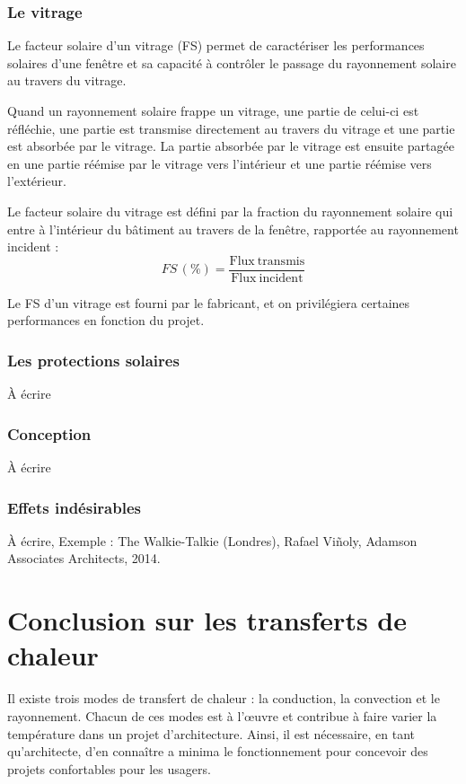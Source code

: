 \subsection*{Le vitrage}
Le facteur solaire d'un vitrage (FS) permet de caractériser les performances solaires d'une fenêtre et sa capacité à contrôler le passage du rayonnement solaire au travers du vitrage.

Quand un rayonnement solaire frappe un vitrage, une partie de celui-ci est réfléchie, une partie est transmise directement au travers du vitrage et une partie est absorbée par le vitrage. La partie absorbée par le vitrage est ensuite partagée en une partie réémise par le vitrage vers l'intérieur et une partie réémise vers l'extérieur.

Le facteur solaire du vitrage est défini par la fraction du rayonnement solaire qui entre à l'intérieur du bâtiment au travers de la fenêtre, rapportée au rayonnement incident :
\begin{equation}
  FS\,(\%) = \frac{\mathrm{Flux\ transmis}}{\mathrm{Flux\ incident}}
\end{equation}

Le FS d'un vitrage est fourni par le fabricant, et on privilégiera certaines performances en fonction du projet.

\subsection*{Les protections solaires}
À écrire

\subsection*{Conception}
À écrire

\subsection*{Effets indésirables}
À écrire, Exemple : The Walkie-Talkie (Londres), Rafael Viñoly, Adamson Associates Architects, 2014.

\chapter{Conclusion sur les transferts de chaleur}
Il existe trois modes de transfert de chaleur : la conduction, la convection et le rayonnement. Chacun de ces modes est à l’œuvre et contribue à faire varier la température dans un projet d’architecture.
Ainsi, il est nécessaire, en tant qu’architecte, d’en connaître a minima le fonctionnement pour concevoir des projets confortables pour les usagers.


